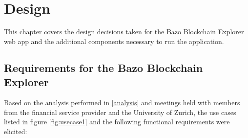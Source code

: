 \chapter{Design} \label{chap:design}
This chapter covers the design decisions taken for the Bazo Blockchain Explorer web app and the additional components necessary to run the application.

\section{Requirements for the Bazo Blockchain Explorer}
Based on the analysis performed in \ref{analysis} and meetings held with members from the financial service provider and the University of Zurich, the use cases listed in figure \ref{fig:usecase1} and the following functional requirements were elicited:

